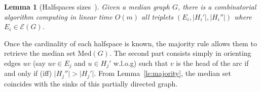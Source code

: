 \documentclass[11pt,letterpaper]{article}
\newtheorem{lemma}{Lemma}
\newcommand{\med}{\mbox{Med}}
\begin{document}
\begin{lemma}[Halfspaces sizes~\cite{BeChChVa20}]
    Given a median graph $G$, there is a combinatorial algorithm computing in linear time $O(m)$ all triplets $(E_i,\vert H_i'\vert, \vert H_i'' \vert)$ where $E_i \in \mathcal{E}(G)$.
    \label{le:enum_halfspaces}
\end{lemma} 

Once the cardinality of each halfspace is known, the majority rule allows them to retrieve the median set $\med(G)$. The second part consists simply in orienting edges $uv$ (say $uv \in E_j$ and $u \in H_j'$ w.l.o.g)  such that $v$ is the head of the arc if and only if (iff) $\vert H_j'' \vert > \vert H_j' \vert$. From Lemma~\ref{le:majority}, the median set coincides with the sinks of this partially directed graph.

\begin{comment}
\textbf{Number of hypercubes}. We remind a formula establishing a relationship between the number of POFs and the number of hypercubes in the literature. Let $\alpha(G)$ (resp. $\beta(G)$) be the number of hypercubes (resp. POFs) in $G$. Let $\beta_i(G)$ be the number of POFs of cardinality $i \le d$ in $G$. According to~\cite{BaQuSaMa02,Ko09}, we have:
\begin{equation}
\alpha(G) = \sum_{i=0}^d 2^i\beta_i(G)
\label{eq:number_hypercubes}
\end{equation}

Equation~\eqref{eq:number_hypercubes} produces a natural upper bound for the number of hypercubes.

\begin{lemma}[Number of hypercubes]
$\alpha(G)\le 2^dn$.
\label{le:number_hypercubes}
\end{lemma}

Value $\alpha(G)$ consider all hypercubes, in particular those of dimension 0, {\em i.e.} vertices. From now on, the word ``hypercube'' refers to the hypercubes of dimension at least one.

Each hypercube in the median graph $G$ can be defined with only its anti-basis $v$ and the edges $\widehat{N}$ of the hypercube that are adjacent and going into $v$ according to the $v_0$-orientation. These edges are a subset of $N^-(v)$: $\widehat{N} \subseteq N^-(v)$. Conversely, given a vertex $v$, each subset of $N^-(v)$ produces a hypercube which admits $v$ as an anti-basis (this hypercube is a sub-hypercube of the one obtained with $v$ and $N^-(v)$, Lemma~\ref{le:pof_hypercube}). Another possible bijection is to consider a hypercube as a pair composed of its anti-basis $v$ and the $\Theta$-classes $\widehat{\mathcal{E}}$ of the edges in $\widehat{N}$ (its signature).


\end{comment}
\end{document}
